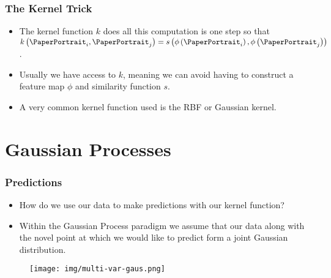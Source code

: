 \documentclass[9pt,hyperref={pdfpagelabels=false},xcolor=table]{beamer}
\begin{document}
\begin{frame}
    \frametitle{The Kernel Trick}
    \begin{itemize}
        \item The kernel function $k$ does all this computation is one step so that $k \left( \text{\PaperPortrait}_i , \text{\PaperPortrait}_j \right) = s \left( \phi \left( \text{\PaperPortrait}_i \right), \phi \left( \text{\PaperPortrait}_j \right) \right)$.
        \item Usually we have access to $k$, meaning we can avoid having to construct a feature map $\phi$ and similarity function $s$.
        \item A very common kernel function used is the RBF or Gaussian kernel.
    \end{itemize}
    \vspace*{-\baselineskip}
    \vspace*{-\baselineskip}
    \begin{figure}[h]
        \centering
    \end{figure}
\end{frame}

\section{Gaussian Processes}

\begin{frame}
    \frametitle{Predictions}
    \begin{itemize}
        \item How do we use our data to make predictions with our kernel function?
        \item Within the Gaussian Process paradigm we assume that our data along with the novel point at which we would like to predict form a joint Gaussian distribution.
    \end{itemize}
    \begin{figure}
        \centering
        \texttt{[image: img/multi-var-gaus.png]}
    \end{figure}
\end{frame}
\end{document}
